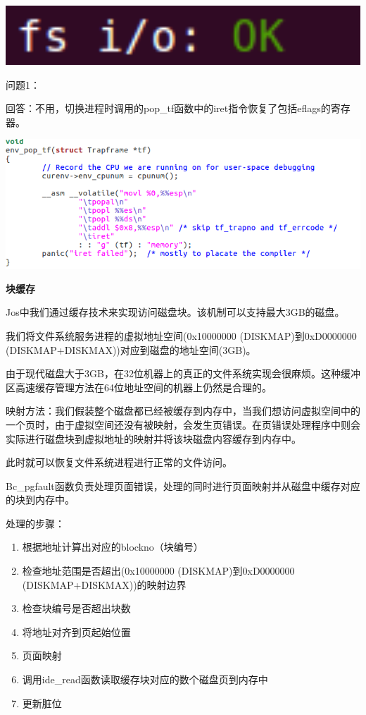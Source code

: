 \begin{ExerciseList}
  \includegraphics[width=6in]{figures/lab5/image65.png}

  问题1：

  回答：不用，切换进程时调用的pop\_tf函数中的iret指令恢复了包括eflags的寄存器。

  \includegraphics[width=6in]{figures/lab5/image67.png}

  \textbf{块缓存}

  Jos中我们通过缓存技术来实现访问磁盘块。该机制可以支持最大3GB的磁盘。

  我们将文件系统服务进程的虚拟地址空间(0x10000000 (DISKMAP)到0xD0000000 (DISKMAP+DISKMAX))对应到磁盘的地址空间(3GB)。

  由于现代磁盘大于3GB，在32位机器上的真正的文件系统实现会很麻烦。这种缓冲区高速缓存管理方法在64位地址空间的机器上仍然是合理的。

  映射方法：我们假装整个磁盘都已经被缓存到内存中，当我们想访问虚拟空间中的一个页时，由于虚拟空间还没有被映射，会发生页错误。在页错误处理程序中则会实际进行磁盘块到虚拟地址的映射并将该块磁盘内容缓存到内存中。

  此时就可以恢复文件系统进程进行正常的文件访问。


  Bc\_pgfault函数负责处理页面错误，处理的同时进行页面映射并从磁盘中缓存对应的块到内存中。

  处理的步骤：

  \begin{enumerate}
  \item 根据地址计算出对应的blockno（块编号）
  \item 检查地址范围是否超出(0x10000000 (DISKMAP)到0xD0000000 (DISKMAP+DISKMAX))的映射边界
  \item 检查块编号是否超出块数
  \item 将地址对齐到页起始位置
  \item 页面映射
  \item 调用ide\_read函数读取缓存块对应的数个磁盘页到内存中
  \item 更新脏位
  \end{enumerate}


\end{ExerciseList}
